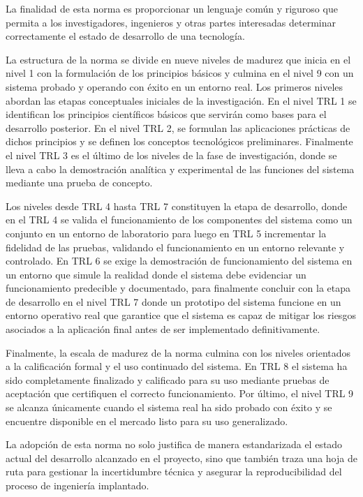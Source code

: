 La finalidad de esta norma es proporcionar un lenguaje común y riguroso que permita a los investigadores, ingenieros y otras partes interesadas determinar correctamente el estado de desarrollo de una tecnología.

La estructura de la norma se divide en nueve niveles de madurez que inicia en el nivel 1 con la formulación de los principios básicos y culmina en el nivel 9 con un sistema probado y operando con éxito en un entorno real. Los primeros niveles abordan las etapas conceptuales iniciales de la investigación. En el nivel TRL 1 se identifican los principios científicos básicos que servirán como bases para el desarrollo posterior. En el nivel TRL 2, se formulan las aplicaciones prácticas de dichos principios y se definen los conceptos tecnológicos preliminares. Finalmente el nivel TRL 3 es el último de los niveles de la fase de investigación, donde se lleva a cabo la demostración analítica y experimental de las funciones del sistema mediante una prueba de concepto.

Los niveles desde TRL 4 hasta TRL 7 constituyen la etapa de desarrollo, donde en el TRL 4 se valida el funcionamiento de los componentes del sistema como un conjunto en un entorno de laboratorio para luego en TRL 5 incrementar la fidelidad de las pruebas, validando el funcionamiento en un entorno relevante y controlado. En TRL 6 se exige la demostración de funcionamiento del sistema en un entorno que simule la realidad donde el sistema debe evidenciar un funcionamiento predecible y documentado, para finalmente concluir con la etapa de desarrollo en el nivel TRL 7 donde un prototipo del sistema funcione en un entorno operativo real que garantice que el sistema es capaz de mitigar los riesgos asociados a la aplicación final antes de ser implementado definitivamente.

Finalmente, la escala de madurez de la norma culmina con los niveles orientados a la calificación formal y el uso continuado del sistema. En TRL 8 el sistema ha sido completamente finalizado y calificado para su uso mediante pruebas de aceptación que certifiquen el correcto funcionamiento. Por último, el nivel TRL 9 se alcanza únicamente cuando el sistema real ha sido probado con éxito y se encuentre disponible en el mercado listo para su uso generalizado.

La adopción de esta norma no solo justifica de manera estandarizada el estado actual del desarrollo alcanzado en el proyecto, sino que también traza una hoja de ruta para gestionar la incertidumbre técnica y asegurar la reproducibilidad del proceso de ingeniería implantado.

